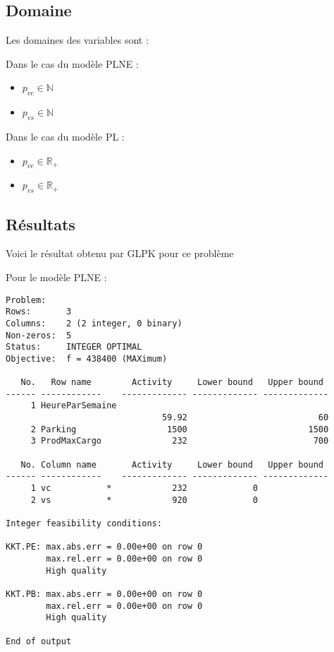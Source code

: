 \subsection{Domaine}
Les domaines des variables sont :

Dans le cas du modèle PLNE :

\begin{itemize}

\item $p_{vc} \in \mathbb{N} $
\item $p_{vs} \in \mathbb{N} $

\end{itemize}

Dans le cas du modèle PL :

\begin{itemize}

\item $p_{vc} \in \mathbb{R}_{+} $
\item $p_{vs} \in \mathbb{R}_{+} $

\end{itemize}


\subsection{Résultats}
Voici le résultat obtenu par GLPK pour ce problème

Pour le modèle PLNE :

\begin{lstlisting}
Problem:
Rows:       3
Columns:    2 (2 integer, 0 binary)
Non-zeros:  5
Status:     INTEGER OPTIMAL
Objective:  f = 438400 (MAXimum)

   No.   Row name        Activity     Lower bound   Upper bound
------ ------------    ------------- ------------- -------------
     1 HeureParSemaine
                               59.92                          60
     2 Parking                  1500                        1500
     3 ProdMaxCargo              232                         700

   No. Column name       Activity     Lower bound   Upper bound
------ ------------    ------------- ------------- -------------
     1 vc           *            232             0
     2 vs           *            920             0

Integer feasibility conditions:

KKT.PE: max.abs.err = 0.00e+00 on row 0
        max.rel.err = 0.00e+00 on row 0
        High quality

KKT.PB: max.abs.err = 0.00e+00 on row 0
        max.rel.err = 0.00e+00 on row 0
        High quality

End of output
\end{lstlisting}

